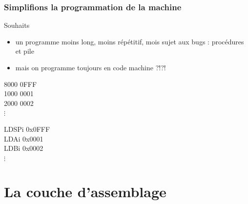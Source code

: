 \documentclass{beamer}
\begin{document}
\begin{frame}
\frametitle{Simplifions la programmation de la machine}

\begin{block}{Souhaits}
\begin{itemize}
\item un programme moins long, moins répétitif, mois sujet aux bugs : procédures et pile
\item mais on programme toujours en code machine ?!?!
\end{itemize}
\end{block}

\begin{minipage}[c]{0.46\linewidth}
8000 0FFF\\
1000 0001\\
2000 0002\\
$\vdots$
\end{minipage}
\begin{minipage}[c]{0.46\linewidth}
LDSPi 0x0FFF\\
LDAi  0x0001\\
LDBi  0x0002\\
$\vdots$
\end{minipage}

\end{frame}



\section{La couche d'assemblage} 
\end{document}
